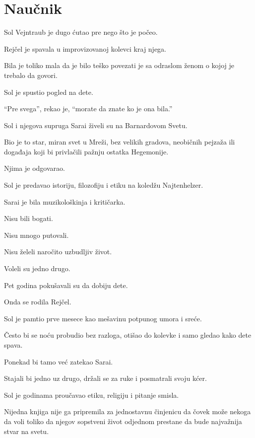 \chapter{Naučnik}


Sol Vejntraub je dugo ćutao pre nego što je počeo.

Rejčel je spavala u improvizovanoj kolevci kraj njega.

Bila je toliko mala da je bilo teško povezati je sa odraslom ženom o kojoj je trebalo da govori.

Sol je spustio pogled na dete.

``Pre svega'', rekao je, ``morate da znate ko je ona bila.''

\bigskip

Sol i njegova supruga Sarai živeli su na Barnardovom Svetu.

Bio je to star, miran svet u Mreži, bez velikih gradova, neobičnih pejzaža ili događaja koji bi privlačili pažnju ostatka Hegemonije.

Njima je odgovarao.

Sol je predavao istoriju, filozofiju i etiku na koledžu Najtenhelzer.

Sarai je bila muzikološkinja i kritičarka.

Nisu bili bogati.

Nisu mnogo putovali.

Nisu želeli naročito uzbudljiv život.

Voleli su jedno drugo.

Pet godina pokušavali su da dobiju dete.

Onda se rodila Rejčel.

Sol je pamtio prve mesece kao mešavinu potpunog umora i sreće.

Često bi se noću probudio bez razloga, otišao do kolevke i samo gledao kako dete spava.

Ponekad bi tamo već zatekao Sarai.

Stajali bi jedno uz drugo, držali se za ruke i posmatrali svoju kćer.

Sol je godinama proučavao etiku, religiju i pitanje smisla.

Nijedna knjiga nije ga pripremila za jednostavnu činjenicu da čovek može nekoga da voli toliko da njegov sopstveni život odjednom prestane da bude najvažnija stvar na svetu.

